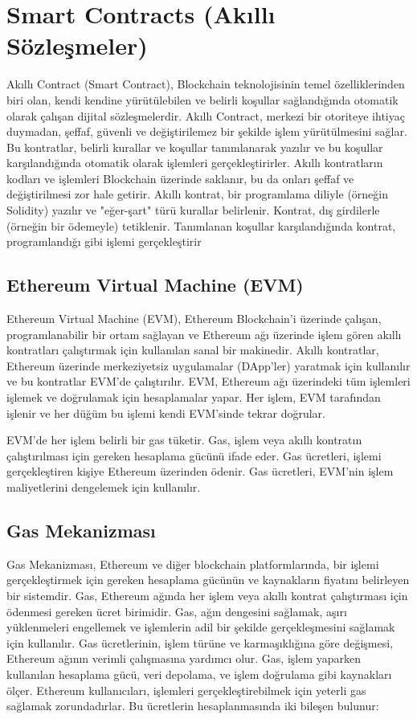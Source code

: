 \section{Smart Contracts (Akıllı Sözleşmeler)}

Akıllı Contract (Smart Contract), Blockchain teknolojisinin temel özelliklerinden biri olan, kendi kendine yürütülebilen ve belirli koşullar sağlandığında otomatik olarak çalışan dijital sözleşmelerdir. Akıllı Contract, merkezi bir otoriteye ihtiyaç duymadan, şeffaf, güvenli ve değiştirilemez bir şekilde işlem yürütülmesini sağlar. Bu kontratlar, belirli kurallar ve koşullar tanımlanarak yazılır ve bu koşullar karşılandığında otomatik olarak işlemleri gerçekleştirirler. Akıllı kontratların kodları ve işlemleri Blockchain üzerinde saklanır, bu da onları şeffaf ve değiştirilmesi zor hale getirir. Akıllı kontrat, bir programlama diliyle (örneğin Solidity) yazılır ve "eğer-şart" türü kurallar belirlenir. Kontrat, dış girdilerle (örneğin bir ödemeyle) tetiklenir. Tanımlanan koşullar karşılandığında kontrat, programlandığı gibi işlemi gerçekleştirir

\subsection{Ethereum Virtual Machine (EVM)}

Ethereum Virtual Machine (EVM), Ethereum Blockchain’i üzerinde çalışan, programlanabilir bir ortam sağlayan ve Ethereum ağı üzerinde işlem gören akıllı kontratları çalıştırmak için kullanılan sanal bir makinedir. Akıllı kontratlar, Ethereum üzerinde merkeziyetsiz uygulamalar (DApp'ler) yaratmak için kullanılır ve bu kontratlar EVM’de çalıştırılır. EVM, Ethereum ağı üzerindeki tüm işlemleri işlemek ve doğrulamak için hesaplamalar yapar. Her işlem, EVM tarafından işlenir ve her düğüm bu işlemi kendi EVM’sinde tekrar doğrular.

EVM’de her işlem belirli bir gas tüketir. Gas, işlem veya akıllı kontratın çalıştırılması için gereken hesaplama gücünü ifade eder. Gas ücretleri, işlemi gerçekleştiren kişiye Ethereum üzerinden ödenir. Gas ücretleri, EVM’nin işlem maliyetlerini dengelemek için kullanılır.

\subsection{Gas Mekanizması}

Gas Mekanizması, Ethereum ve diğer blockchain platformlarında, bir işlemi gerçekleştirmek için gereken hesaplama gücünün ve kaynakların fiyatını belirleyen bir sistemdir. Gas, Ethereum ağında her işlem veya akıllı kontrat çalıştırması için ödenmesi gereken ücret birimidir. Gas, ağın dengesini sağlamak, aşırı yüklenmeleri engellemek ve işlemlerin adil bir şekilde gerçekleşmesini sağlamak için kullanılır. Gas ücretlerinin, işlem türüne ve karmaşıklığına göre değişmesi, Ethereum ağının verimli çalışmasına yardımcı olur. Gas, işlem yaparken kullanılan hesaplama gücü, veri depolama, ve işlem doğrulama gibi kaynakları ölçer. Ethereum kullanıcıları, işlemleri gerçekleştirebilmek için yeterli gas sağlamak zorundadırlar. Bu ücretlerin hesaplanmasında iki bileşen bulunur:

